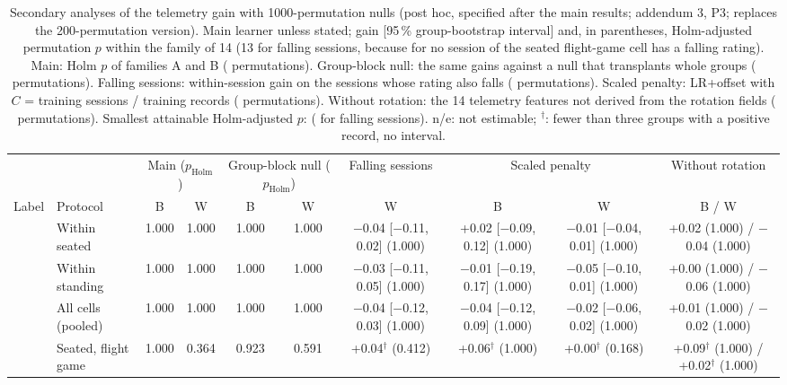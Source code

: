 \begin{table}[ht]
\centering
\scriptsize
\caption{Secondary analyses of the telemetry gain with 1000-permutation nulls (post hoc, specified after the main results; addendum 3, P3; replaces the 200-permutation version). Main learner unless stated; gain [95\,\% group-bootstrap interval] and, in parentheses, Holm-adjusted permutation $p$ within the family of 14 (13 for falling sessions, because for \sevone{} no session of the seated flight-game cell has a falling rating). Main: Holm $p$ of families A and B ( permutations). Group-block null: the same gains against a null that transplants whole groups ( permutations). Falling sessions: within-session gain on the sessions whose rating also falls ( permutations). Scaled penalty: LR+offset with $C$ = training sessions / training records ( permutations). Without rotation: the 14 telemetry features not derived from the rotation fields ( permutations). Smallest attainable Holm-adjusted $p$:  ( for falling sessions). n/e: not estimable; $^\dagger$: fewer than three groups with a positive record, no interval.}
\label{tab:a3_secondary}
\setlength{\tabcolsep}{2pt}
\begin{tabular}{@{}llcccccccc@{}}
\toprule
 & & \multicolumn{2}{c}{Main ($p_\mathrm{Holm}$)} & \multicolumn{2}{c}{Group-block null ($p_\mathrm{Holm}$)} & Falling sessions & \multicolumn{2}{c}{Scaled penalty} & Without rotation \\
\cmidrule(lr){3-4}\cmidrule(lr){5-6}\cmidrule(lr){7-7}\cmidrule(lr){8-9}\cmidrule(lr){10-10}
Label & Protocol & B & W & B & W & W & B & W & B / W \\
\midrule
\sevtwo{} & Within seated & 1.000 & 1.000 & 1.000 & 1.000 & $-$0.04 [$-$0.11, 0.02] (1.000) & +0.02 [$-$0.09, 0.12] (1.000) & $-$0.01 [$-$0.04, 0.01] (1.000) & +0.02 (1.000) / $-$0.04 (1.000) \\
 & Within standing & 1.000 & 1.000 & 1.000 & 1.000 & $-$0.03 [$-$0.11, 0.05] (1.000) & $-$0.01 [$-$0.19, 0.17] (1.000) & $-$0.05 [$-$0.10, 0.01] (1.000) & +0.00 (1.000) / $-$0.06 (1.000) \\
 & All cells (pooled) & 1.000 & 1.000 & 1.000 & 1.000 & $-$0.04 [$-$0.12, 0.03] (1.000) & $-$0.04 [$-$0.12, 0.09] (1.000) & $-$0.02 [$-$0.06, 0.02] (1.000) & +0.01 (1.000) / $-$0.02 (1.000) \\
 & Seated, flight game & 1.000 & 0.364 & 0.923 & 0.591 & +0.04$^\dagger$ (0.412) & +0.06$^\dagger$ (1.000) & +0.00$^\dagger$ (0.168) & +0.09$^\dagger$ (1.000) / +0.02$^\dagger$ (1.000) \\

\end{tabular}
\end{table}
